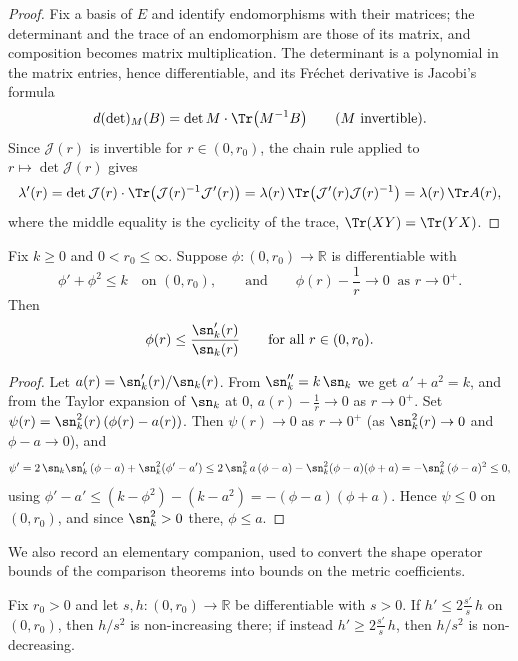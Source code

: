 \begin{proof}
\leanok
Fix a basis of $E$ and identify endomorphisms with their matrices; the
determinant and the trace of an endomorphism are those of its matrix, and
composition becomes matrix multiplication. The determinant is a polynomial
in the matrix entries, hence differentiable, and its Fréchet derivative is
Jacobi's formula
$$d(\det)_M(B)=\det M\cdot\Tr\bigl(M^{-1}B\bigr)\qquad(M\ \text{invertible}).$$
Since ${\mathcal J}(r)$ is invertible for $r\in(0,r_0)$, the chain rule
applied to $r\mapsto\det{\mathcal J}(r)$ gives
$$\lambda'(r)=\det{\mathcal J}(r)\cdot
\Tr\bigl({\mathcal J}(r)^{-1}{\mathcal J}'(r)\bigr)
=\lambda(r)\,\Tr\bigl({\mathcal J}'(r){\mathcal J}(r)^{-1}\bigr)
=\lambda(r)\,\Tr A(r),$$
where the middle equality is the cyclicity of the trace,
$\Tr(XY)=\Tr(YX)$.
\end{proof}

\begin{lemma}
\label{lem:scalar-riccati-comparison}
\leanok
Fix $k\ge 0$ and $0<r_0\le\infty$. Suppose $\phi\colon
(0,r_0)\to\mathbb{R}$ is differentiable with
$$\phi'+\phi^2\le k\quad\text{on }(0,r_0),\qquad\text{and}\qquad
\phi(r)-\frac1r\to0\ \text{ as } r\to0^+.$$
Then
$$\phi(r)\le\frac{\sn_k'(r)}{\sn_k(r)}\qquad\text{for all }r\in
(0,r_0).$$
\end{lemma}

\begin{proof}
\leanok
Let $a(r)=\sn_k'(r)/\sn_k(r)$. From $\sn_k''=k\,\sn_k$ we get
$a'+a^2=k$, and from the Taylor expansion of $\sn_k$ at $0$,
$a(r)-\frac1r\to0$ as $r\to0^+$. Set
$\psi(r)=\sn_k^2(r)\left(\phi(r)-a(r)\right)$. Then
$\psi(r)\to0$ as $r\to0^+$ (as $\sn_k^2(r)\to 0$ and $\phi-a\to0$),
and
$$\psi'=2\,\sn_k\sn_k'\,(\phi-a)+\sn_k^2(\phi'-a')
\le 2\,\sn_k^2\,a\,(\phi-a)-\sn_k^2(\phi-a)(\phi+a)
=-\sn_k^2\,(\phi-a)^2\le0,$$
using $\phi'-a'\le(k-\phi^2)-(k-a^2)=-(\phi-a)(\phi+a)$. Hence
$\psi\le0$ on $(0,r_0)$, and since $\sn_k^2>0$ there,
$\phi\le a$.
\end{proof}

We also record an elementary companion, used to convert the shape
operator bounds of the comparison theorems into bounds on the metric
coefficients.

\begin{lemma}
\label{lem:ratio-monotone}
\leanok
Fix $r_0>0$ and let $s,h\colon(0,r_0)\to\mathbb R$ be differentiable
with $s>0$. If $h'\le 2\frac{s'}{s}\,h$ on $(0,r_0)$, then $h/s^2$
is non-increasing there; if instead $h'\ge2\frac{s'}{s}\,h$, then
$h/s^2$ is non-decreasing.
\end{lemma}

